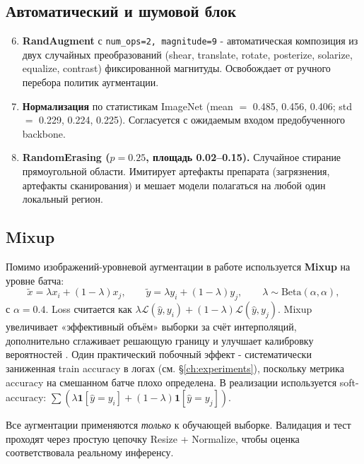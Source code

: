\documentclass[14pt,a4paper]{extreport}
\begin{document}
\subsection{Автоматический и шумовой блок}

\begin{enumerate}
    \setcounter{enumi}{5}
    \item \textbf{RandAugment} \cite{cubuk2020randaugment} с
          \texttt{num\_ops=2, magnitude=9} - автоматическая
          композиция из двух случайных преобразований (shear, translate,
          rotate, posterize, solarize, equalize, contrast) фиксированной
          магнитуды. Освобождает от ручного перебора политик
          аугментации.
    \item \textbf{Нормализация} по статистикам ImageNet (mean $=$ 0.485,
          0.456, 0.406; std $=$ 0.229, 0.224, 0.225). Согласуется с
          ожидаемым входом предобученного backbone.
    \item \textbf{RandomErasing ($p=0.25$, площадь 0.02--0.15).}
          Случайное стирание прямоугольной области. Имитирует
          артефакты препарата (загрязнения, артефакты сканирования) и
          мешает модели полагаться на любой один локальный регион.
\end{enumerate}

\subsection{Mixup}

Помимо изображений-уровневой аугментации в работе используется
\textbf{Mixup} \cite{zhang2018mixup} на уровне батча:
\[
    \tilde{x} = \lambda x_i + (1-\lambda) x_j,
    \qquad
    \tilde{y} = \lambda y_i + (1-\lambda) y_j,
    \qquad
    \lambda \sim \text{Beta}(\alpha, \alpha),
\]
с $\alpha = 0.4$. Loss считается как
$\lambda \mathcal{L}(\hat y, y_i) + (1-\lambda) \mathcal{L}(\hat y, y_j)$.
Mixup увеличивает «эффективный объём» выборки за счёт интерполяций,
дополнительно сглаживает решающую границу и улучшает калибровку
вероятностей \cite{zhang2018mixup}. Один практический побочный эффект -
систематически заниженная train accuracy в логах
(см. \S\ref{ch:experiments}), поскольку метрика accuracy на смешанном
батче плохо определена. В реализации используется soft-accuracy:
$\sum (\lambda \mathbf{1}[\hat y = y_i] + (1-\lambda) \mathbf{1}[\hat y = y_j])$.

Все аугментации применяются \textit{только} к обучающей выборке.
Валидация и тест проходят через простую цепочку Resize + Normalize, чтобы
оценка соответствовала реальному инференсу.
\end{document}
